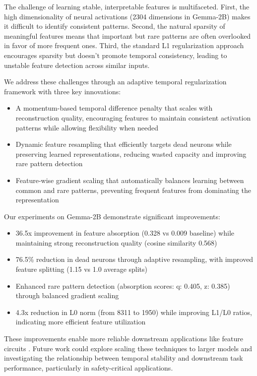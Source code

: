 \documentclass{article} %
\begin{document}
The challenge of learning stable, interpretable features is multifaceted. First, the high dimensionality of neural activations (2304 dimensions in Gemma-2B) makes it difficult to identify consistent patterns. Second, the natural sparsity of meaningful features means that important but rare patterns are often overlooked in favor of more frequent ones. Third, the standard L1 regularization approach encourages sparsity but doesn't promote temporal consistency, leading to unstable feature detection across similar inputs.

We address these challenges through an adaptive temporal regularization framework with three key innovations:

\begin{itemize}
    \item A momentum-based temporal difference penalty that scales with reconstruction quality, encouraging features to maintain consistent activation patterns while allowing flexibility when needed
    \item Dynamic feature resampling that efficiently targets dead neurons while preserving learned representations, reducing wasted capacity and improving rare pattern detection
    \item Feature-wise gradient scaling that automatically balances learning between common and rare patterns, preventing frequent features from dominating the representation
\end{itemize}

Our experiments on Gemma-2B demonstrate significant improvements:

\begin{itemize}
    \item 36.5x improvement in feature absorption (0.328 vs 0.009 baseline) while maintaining strong reconstruction quality (cosine similarity 0.568)
    \item 76.5\% reduction in dead neurons through adaptive resampling, with improved feature splitting (1.15 vs 1.0 average splits)
    \item Enhanced rare pattern detection (absorption scores: q: 0.405, z: 0.385) through balanced gradient scaling
    \item 4.3x reduction in L0 norm (from 8311 to 1950) while improving L1/L0 ratios, indicating more efficient feature utilization
\end{itemize}

These improvements enable more reliable downstream applications like feature circuits \cite{marksSparseFeatureCircuits2024}. Future work could explore scaling these techniques to larger models and investigating the relationship between temporal stability and downstream task performance, particularly in safety-critical applications.
\end{document}
